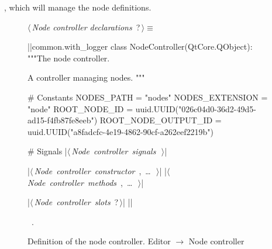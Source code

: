 \documentclass[%
    a4paper,    %
    justified,  %
    nobib,      %
    openany     %
]{tufte-book}
\begin{document}
, which will manage the
node definitions.

\begin{figure}
\begin{flushleft} \small
\begin{minipage}{\linewidth}\label{scrap106}\raggedright\small
{} $\langle\,${\itshape Node controller declarations}\nobreak\ {\footnotesize {?}}$\,\rangle\equiv$
\vspace{-1ex}
\begin{pythoncode}
|\normalfont{}\fontfamily{}|common.with_logger
class NodeController(QtCore.QObject):
    """The node controller.

    A controller managing nodes.
    """

    # Constants
    NODES_PATH = "nodes"
    NODES_EXTENSION = "node"
    ROOT_NODE_ID = uuid.UUID("026c04d0-36d2-49d5-ad15-f4fb87fe8eeb")
    ROOT_NODE_OUTPUT_ID = uuid.UUID("a8fadcfc-4e19-4862-90cf-a262eef2219b")

    # Signals
    |\hbox{$\langle\,${\itshape Node controller signals}\nobreak\ {\footnotesize {}}$\,\rangle$}|

    |\hbox{$\langle\,${\itshape Node controller constructor}\nobreak\ {\footnotesize {}, \ldots\ }$\,\rangle$}|
    |\hbox{$\langle\,${\itshape Node controller methods}\nobreak\ {\footnotesize {}, \ldots\ }$\,\rangle$}|

    |\hbox{$\langle\,${\itshape Node controller slots}\nobreak\ {\footnotesize ?}$\,\rangle$}|
|\NWsep|
\end{pythoncode}
\vspace{1.5ex}
\footnotesize
\begin{list}{}{\setlength{\itemsep}{-\parsep}\setlength{\itemindent}{-\leftmargin}}
\item \NWtxtMacroRefIn\ .

\item{}
\end{list}
\end{minipage}\vspace{4ex}
\end{flushleft}
\caption{Definition of the node controller.
  \newline{}\newline{}Editor $\rightarrow$ Node controller}
\label{editor:lst:node-controller}
\end{figure}
\end{document}
